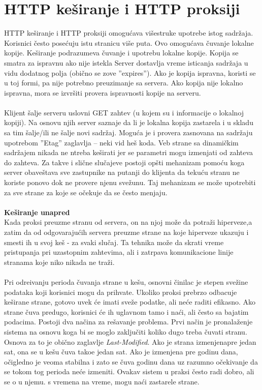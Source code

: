 \documentclass{article} %
\begin{document}
%
%

\section{HTTP ke\v siranje i HTTP proksiji}

HTTP ke\v siranje i HTTP proksiji omogu\' cava vi\v sestruke upotrebe istog sadr\v zaja. Korisnici \v cesto pose\' cuju istu stranicu vi\v se puta. Ovo omogu\' cava \v cuvanje lokalne kopije. Ke\v siranje podrazumeva \v cuvanje i upotrebu lokalne kopije. Kopija se smatra za ispravnu ako nije istekla Server dostavlja vreme isticanja sadr\v zaja u vidu dodatnog polja (obi\v cno se zove ''expires''). Ako je kopija ispravna, koristi se u toj formi, pa nije potrebno preuzimanje sa servera. Ako kopija nije lokalno ispravna, mora se izvr\v siti provera ispravnosti kopije na serveru.
\\
\\ Klijent \v salje serveru uslovni GET zahtev (u kojem su i informacije o lokalnoj kopiji). Na osnovu njih server saznaje da li je lokalna kopija zastarela
i u skladu sa tim \v salje/ili ne \v salje novi sadr\v zaj. Mogu\' ca je i provera zasnovana na sadr\v zaju upotrebom ''Etag'' zaglavlja – neki vid he\v s koda. Veb strane sa dinami\v ckim sadr\v zajem nikada ne ntreba ke\v sirati jer se parametri mogu izmenjati od zahteva do zahteva. Za takve i sli\v cne slu\v cajeve postoji op\v sti mehanizam pomo\' cu koga server obave\v stava sve zastupnike na putanji do klijenta da teku\' cu stranu ne koriste ponovo dok ne provere njenu sve\v zunu. Taj mehanizam se mo\v ze upotrebiti za sve strane za koje se o\v cekuje da se \v cesto menjaju.
\\
\\\textbf{Ke\v siranje unapred}
\\ Kada proksi preuzme stranu od servera, on na njoj mo\v ze da potra\v zi hiperveze,a zatim da od odgovaraju\' cih servera preuzme strane na koje hiperveze ukazuju i smesti ih u svoj ke\v s - za svaki slu\v caj. Ta tehnika mo\v ze da skrati vreme pristupanja pri uzastopnim zahtevima, ali i zatrpava komunikacione linije stranama koje niko nikada ne tra\v zi.
\\
\\ Pri odre\dj ivanju perioda \v cuvanja strane u ke\v su, osnovni \v cinilac je stepen sve\v zine podataka koji korisnici mogu da prihvate. Ukoliko proksi prebrzo odbacuje ke\v sirane strane, gotovo uvek \' ce imati sve\v ze podatke, ali ne\' ce raditi efikasno. Ako strane \v cuva predugo, korisnici \' ce ih uglavnom tamo i na\' ci, ali \v cesto sa bajatim podacima. Postoji dva na\v cina za re\v savanje problema. Prvi na\v cin je pronala\v zenje sistema na osnovu koga bi se moglo zaklju\v citi koliko dugo treba \v cuvati stranu. Osnova za to je obi\v cno zaglavlje \textit{Last-Modified}. Ako je strana izmenjenapre jedan sat, ona se u ke\v su \v cuva tako\dj e jedan sat. Ako je izmenjena pre godinu dana, o\v cigledno je veoma stabilna i zato se \v cuva godinu dana uz razumno o\v cekivanje da se tokom tog perioda ne\' ce izmeniti. Ovakav sistem u praksi \v cesto radi dobro, ali se o u njemu. s vremena na vreme, mogu na\' ci zastarele strane.
\end{document}

